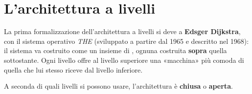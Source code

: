 \section{L'architettura a livelli}


La prima formalizzazione dell'architettura a livelli si deve a \textbf{Edsger Dijkstra}, con il sistema operativo
\textit{THE} (sviluppato a partire dal 1965 e descritto nel 1968): il sistema va costruito come un insieme di
, ognuna costruita \textbf{sopra} quella sottostante. Ogni livello offre al livello superiore una
«macchina» più comoda di quella che lui stesso riceve dal livello inferiore.

A seconda di quali livelli si possono usare, l'architettura è \textbf{chiusa} o \textbf{aperta}.

